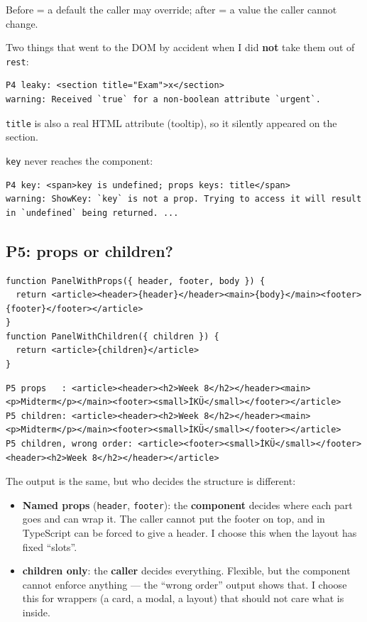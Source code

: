 \documentclass[
  10pt,
]{article}
\providecommand{\tightlist}{%
  \setlength{\itemsep}{0pt}\setlength{\parskip}{0pt}}
\begin{document}
Before = a default the caller may override; after = a value the caller
cannot change.

Two things that went to the DOM by accident when I did \textbf{not} take
them out of \texttt{rest}:

\begin{verbatim}
P4 leaky: <section title="Exam">x</section>
warning: Received `true` for a non-boolean attribute `urgent`.
\end{verbatim}

\texttt{title} is also a real HTML attribute (tooltip), so it silently
appeared on the section.

\texttt{key} never reaches the component:

\begin{verbatim}
P4 key: <span>key is undefined; props keys: title</span>
warning: ShowKey: `key` is not a prop. Trying to access it will result in `undefined` being returned. ...
\end{verbatim}

\hypertarget{p5-props-or-children}{%
\subsection{P5: props or children?}\label{p5-props-or-children}}

\begin{verbatim}
function PanelWithProps({ header, footer, body }) {
  return <article><header>{header}</header><main>{body}</main><footer>{footer}</footer></article>
}
function PanelWithChildren({ children }) {
  return <article>{children}</article>
}
\end{verbatim}

\begin{verbatim}
P5 props   : <article><header><h2>Week 8</h2></header><main><p>Midterm</p></main><footer><small>İKÜ</small></footer></article>
P5 children: <article><header><h2>Week 8</h2></header><main><p>Midterm</p></main><footer><small>İKÜ</small></footer></article>
P5 children, wrong order: <article><footer><small>İKÜ</small></footer><header><h2>Week 8</h2></header></article>
\end{verbatim}

The output is the same, but who decides the structure is different:

\begin{itemize}
\tightlist
\item
  \textbf{Named props} (\texttt{header}, \texttt{footer}): the
  \textbf{component} decides where each part goes and can wrap it. The
  caller cannot put the footer on top, and in TypeScript can be forced
  to give a header. I choose this when the layout has fixed ``slots''.
\item
  \textbf{children only}: the \textbf{caller} decides everything.
  Flexible, but the component cannot enforce anything --- the ``wrong
  order'' output shows that. I choose this for wrappers (a card, a
  modal, a layout) that should not care what is inside.
\end{itemize}
\end{document}
